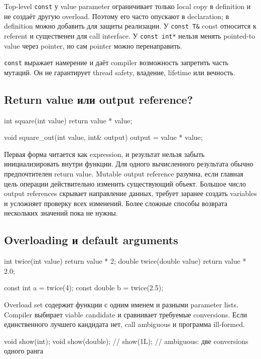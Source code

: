 Top-level \texttt{const} у value parameter ограничивает только local copy в
definition и не создаёт другую overload. Поэтому его часто опускают в
declaration; в definition можно добавить для защиты реализации. У
\texttt{const T\&} const относится к referent и существенен для call
interface. У \texttt{const int*} нельзя менять pointed-to value через pointer,
но сам pointer можно перенаправить.

\texttt{const} выражает намерение и даёт compiler возможность запретить часть
мутаций. Он не гарантирует thread safety, владение, lifetime или вечность.

\subsection{Return value или output reference?}

\begin{cppcode}
int square(int value) {
    return value * value;
}

void square_out(int value, int& output) {
    output = value * value;
}
\end{cppcode}

Первая форма читается как expression, и результат нельзя забыть
инициализировать внутри функции. Для одного вычисленного результата обычно
предпочтителен return value. Mutable output reference разумна, если главная
цель операции действительно изменить существующий объект. Большое число
output references скрывает направление данных, требует заранее создать
variables и усложняет проверку всех изменений. Более сложные способы возврата
нескольких значений пока не нужны.

\subsection{Overloading и default arguments}

\begin{cppcode}
int twice(int value)       { return value * 2; }
double twice(double value) { return value * 2.0; }

const int a = twice(4);
const double b = twice(2.5);
\end{cppcode}

Overload set содержит функции с одним именем и разными parameter lists.
Compiler выбирает viable candidate и сравнивает требуемые conversions. Если
единственного лучшего кандидата нет, call ambiguous и программа ill-formed.

\begin{cppcode}
void show(int);
void show(double);
// show(1L); // ambiguous: две conversions одного ранга
\end{cppcode}

